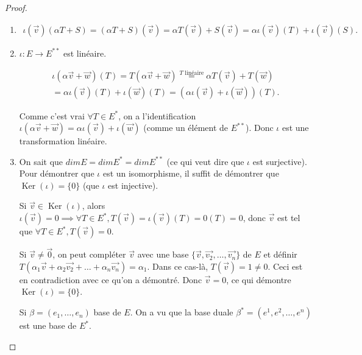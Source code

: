 \documentclass[french]{article}
\theoremstyle{definition}
\begin{document}
\begin{proof}

  \

  \begin{enumerate}
    \item \begin{gather*}
      \iota(\vec{ v } ) (\alpha T+ S) = (\alpha T+S)(\vec{ v } ) = \alpha T(\vec{ v } )+ S(\vec{ v } ) = \alpha \iota(\vec{ v } )(T)+ \iota(\vec{ v } )(S).
  \end{gather*}
    \item $\iota : E \to E ^{**}$ est linéaire.

    \begin{gather*}
      \iota(\alpha \vec{ v } + \vec{ w }  )(T) = T(\alpha \vec{ v } + \vec{ w } ) \stackrel{T \text{ linéaire} }{=} \alpha T(\vec{ v } )+ T(\vec{ w } ) \\
      = \alpha \iota(\vec{ v } )(T)+ \iota(\vec{ w } ) (T) = ( \alpha \iota (\vec{ v } )+ \iota(\vec{ w }) )(T).
    \end{gather*}

    Comme c'est vrai $\forall T \in E ^{*}$, on a l'identification $\iota(\alpha \vec{ v }+ \vec{ w }  ) = \alpha \iota(\vec{ v } )+ \iota(\vec{ w } )$ (comme un élément de $E ^{**}$). Donc $\iota$ est une transformation linéaire.

    \item On sait que $dim E = dim E ^{*} = dim E ^{**}$ (ce qui veut dire que $\iota$ est surjective). Pour démontrer que $\iota$ est un isomorphisme, il suffit de démontrer que $\operatorname{Ker}(\iota) = \{ 0 \} $ (que $\iota$ est injective).
\medskip

    Si $\vec{ v }  \in \operatorname{Ker}(\iota)$, alors $\iota(\vec{ v } ) = 0 \implies \forall T \in E ^{*}, T(\vec{ v } ) = \iota(\vec{ v })(T) = 0(T) =0$, donc $\vec{ v } $ est tel que $\forall T \in E ^{*}, T(\vec{ v } ) =0$.



    Si $\vec{ v } \neq \vec{ 0 }  $, on peut compléter $\vec{ v } $ avec une base $\{ \vec{ v }, \vec{ v_2 },\dots, \vec{ v_n } \} $ de $E$ et définir $T(\alpha_1 \vec{ v } + \alpha_2 \vec{ v_2 } + \dots + \alpha_n \vec{ v_n }  ) = \alpha_1$. Dans ce cas-là, $T(\vec{ v } ) = 1 \neq 0$.
Ceci est en contradiction avec ce qu'on a d\'emontr\'e. Donc $\vec{v} =0$, ce qui d\'emontre  $\operatorname{Ker}(\iota) = \{ 0 \} $.

\bigskip
    Si $\beta = (e_1, \dots, e_n)$ base de $E$. On a vu que la base duale $\beta ^{*} = (e ^{1}, e ^2, \dots, e ^{n})$ est une base de $E ^{*}$.


\end{enumerate}
\end{proof}
\end{document}
